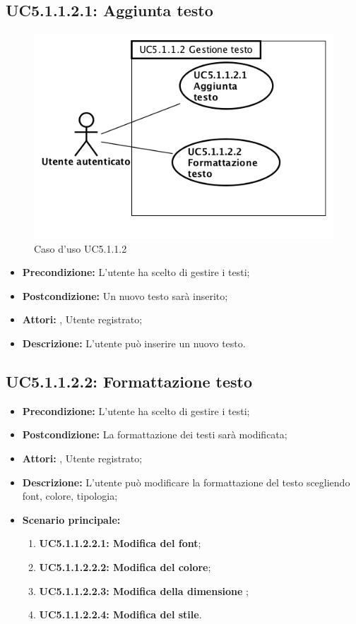 \subsection{ UC5.1.1.2.1: Aggiunta testo}

\begin{figure}[h]
	\begin{center}
	\includegraphics[scale=0.4]{diagram/UC5-1-1-2.png}
	\caption{Caso d'uso UC5.1.1.2}
	\end{center}
\end{figure}
\begin{itemize}
	\item \textbf{Precondizione:} L'utente ha scelto di gestire i testi;
	\item \textbf{Postcondizione:} Un nuovo testo sarà inserito;
	\item \textbf{Attori:} , Utente registrato;
	\item \textbf{Descrizione:} L'utente può inserire un nuovo testo.
\end{itemize}
\subsection{ UC5.1.1.2.2: Formattazione testo}

\begin{itemize}
	\item \textbf{Precondizione:} L'utente ha scelto di gestire i testi;
	\item \textbf{Postcondizione:} La formattazione dei testi sarà modificata;
	\item \textbf{Attori:} , Utente registrato;
	\item \textbf{Descrizione:} L'utente può modificare la formattazione del testo scegliendo font, colore, tipologia;
	\item \textbf{Scenario principale:}
	\begin{enumerate}
		\item \textbf{ UC5.1.1.2.2.1: Modifica del font};
		\item \textbf{ UC5.1.1.2.2.2: Modifica del colore};
		\item \textbf{ UC5.1.1.2.2.3: Modifica della dimensione };
		\item \textbf{ UC5.1.1.2.2.4: Modifica del stile}.
	\end{enumerate}
\end{itemize}

